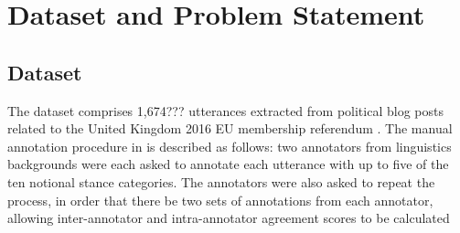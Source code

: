 \documentclass[Dissertation.tex]{subfiles}
\begin{document}
\chapter{Dataset and Problem Statement}
\section{Dataset} \label{Data}

The dataset comprises 1,674??? utterances extracted from political blog posts related to the United Kingdom 2016 EU membership referendum \cite{simakiAnnotatingSpeakerStance2017}. The manual annotation procedure in \cite{simakiAnnotatingSpeakerStance2017} is described as follows: two annotators from linguistics backgrounds were each asked to annotate each utterance with up to five of the ten notional stance categories. The annotators were also asked to repeat the process, in order that there be two sets of annotations from each annotator, allowing inter-annotator and intra-annotator agreement scores to be calculated
\end{document}
